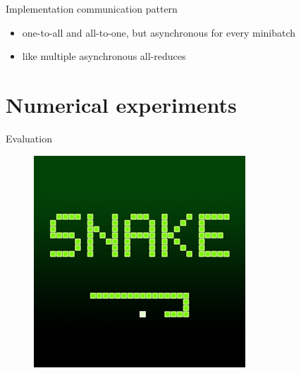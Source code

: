 \begin{frame}{Implementation}
    communication pattern
    \vspace*{0.5em}
    \begin{itemize}\itemsep=12pt
        
        \item one-to-all and all-to-one, but asynchronous for every minibatch

        \item like multiple asynchronous all-reduces

    \end{itemize}
\end{frame}

\section{Numerical experiments}

\begin{frame}{Evaluation}
    \begin{figure}
        \centering
        \includegraphics[height=0.6\textheight]{snake.png}
    \end{figure}
\end{frame}

